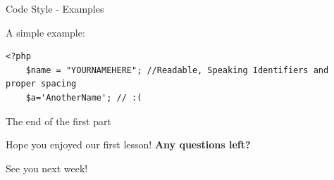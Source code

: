 \begin{frame}[fragile]{Code Style - Examples}

A simple example:

\begin{lstlisting}
<?php
	$name = "YOURNAMEHERE"; //Readable, Speaking Identifiers and proper spacing
	$a='AnotherName'; // :(
	\end{lstlisting}

\end{frame}

\begin{frame}[fragile]{The end of the first part}

Hope you enjoyed our first lesson! \textbf{Any questions left?} \pause

See you next week!

\end{frame}





